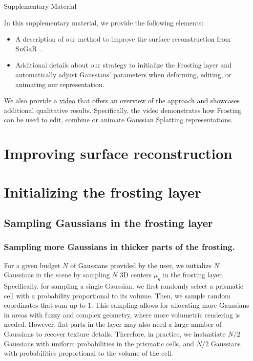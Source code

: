 \newpage
\centerline{\large Supplementary Material}

\vspace{0.3in}
\noindent
In this supplementary material, we provide the following elements:
\begin{itemize}
    \item A description of our method to improve the surface reconstruction from SuGaR~\cite{guedon2023sugar}.
    \item Additional details about our strategy to initialize the Frosting layer and automatically adjust Gaussians' parameters when deforming, editing, or animating our representation.
\end{itemize}
We also provide a \href{https://anttwo.github.io/frosting/}{\underline{video}} that offers an overview of the approach and showcases additional qualitative results. Specifically, the video demonstrates how Frosting can be used to edit, combine or animate Gaussian Splatting representations.

\setcounter{section}{+6}
\section{Improving surface reconstruction}



\section{Initializing the frosting layer}

\subsection{Sampling Gaussians in the frosting layer} 

\subsubsection{Sampling more Gaussians in thicker parts of the frosting.} For a given budget $N$ of Gaussians provided by the user, we initialize $N$ Gaussians in the scene by sampling $N$ 3D centers $\mu_g$ in the frosting layer. Specifically, for sampling a single Gaussian, we first randomly select a prismatic cell with a probability proportional to its volume. Then, we sample random coordinates that sum up to 1. 
%
This sampling allows for allocating more Gaussians in areas with fuzzy and complex geometry, where more volumetric rendering is needed. However, flat parts  in the layer may also need a large number of Gaussians to recover texture details. Therefore, in practice, we instantiate $N/2$ Gaussians with uniform probabilities in the prismatic cells, and $N/2$ Gaussians with probabilities proportional to the volume of the cell.

